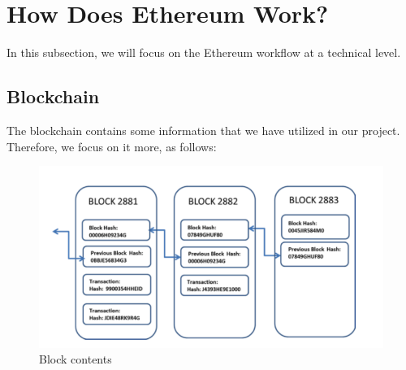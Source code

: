\section{How Does Ethereum Work?}
In this subsection, we will focus on the Ethereum workflow at a technical level.
\subsection{Blockchain}
The blockchain contains some information that we have utilized in our project. Therefore, we focus on it more, as follows:
\begin{center}
	\begin{figure}[htb!]
		
		\begin{minipage}{0.5\linewidth}
			\centering
			\includegraphics[width=1.95\textwidth]{images/chap01_Blockchain.png}
		\end{minipage}
		\caption[Block contents]{Block contents\protect\footnotemark}
	\end{figure}

\end{center}

